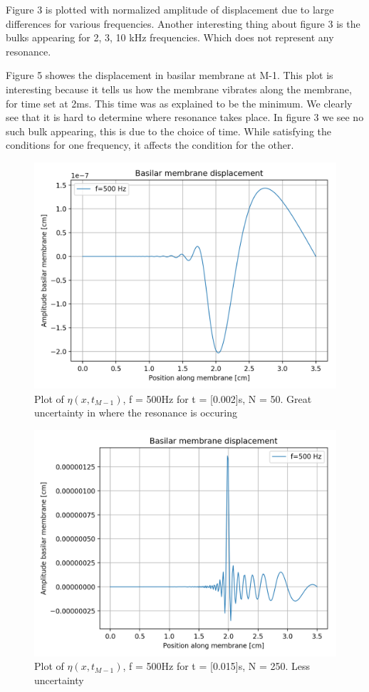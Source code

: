 \documentclass[twoside,twocolumn]{article}
\begin{document}
\bigskip
Figure 3 is plotted with normalized amplitude of displacement due to large differences for various frequencies.  Another interesting thing about figure 3 is the bulks appearing for 2, 3, 10 kHz frequencies. Which does not represent any resonance. 

\bigskip

Figure 5 showes the displacement in basilar membrane at M-1. This plot is interesting because it tells us how the membrane vibrates along the membrane, for time set at 2ms. This time was as explained to be the minimum. We clearly see that it is hard to determine where resonance takes place. In figure 3 we see no such bulk appearing, this is due to the choice of time. While satisfying the conditions for one frequency, it affects the condition for the other.  

\begin{figure}[ht]
\centerline{\includegraphics[scale= 0.45]{Pictures/displacement.png}}
\caption{Plot of $\eta(x,t_{M-1})$, f = 500Hz for  t = [0.002]s, N = 50. Great uncertainty in where the resonance is occuring}
\end{figure}

\begin{figure}[ht]
\centerline{\includegraphics[scale= 0.45]{Pictures/N250s0015.png}}
\caption{Plot of $\eta(x,t_{M-1})$, f = 500Hz for  t = [0.015]s, N = 250. Less uncertainty }
\end{figure}
\end{document}
